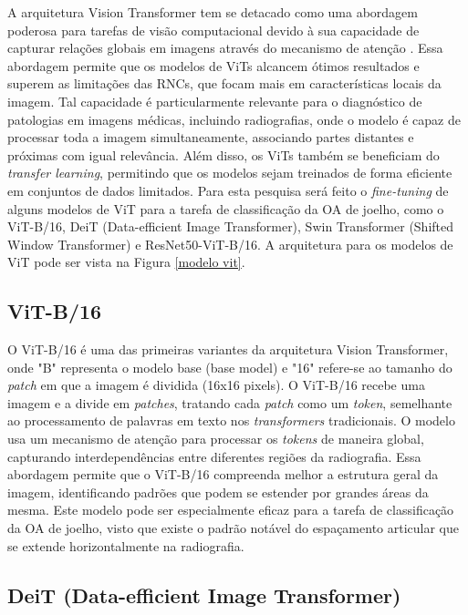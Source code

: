 A arquitetura Vision Transformer tem se detacado como uma abordagem poderosa para tarefas de visão computacional devido à sua capacidade de capturar relações globais em imagens através do mecanismo de atenção \cite{Dosovitskiy2021}. Essa abordagem permite que os modelos de ViTs alcancem ótimos resultados e superem as limitações das RNCs, que focam mais em características locais da imagem. Tal capacidade é particularmente relevante para o diagnóstico de patologias em imagens médicas, incluindo radiografias, onde o modelo é capaz de processar toda a imagem simultaneamente, associando partes distantes e próximas com igual relevância. Além disso, os ViTs também se beneficiam do \textit{transfer learning}, permitindo que os modelos sejam treinados de forma eficiente em conjuntos de dados limitados. Para esta pesquisa será feito o \textit{fine-tuning} de alguns modelos de ViT para a tarefa de classificação da OA de joelho, como o ViT-B/16, DeiT (Data-efficient Image Transformer), Swin Transformer (Shifted Window Transformer) e ResNet50-ViT-B/16. A arquitetura para os modelos de ViT pode ser vista na Figura \ref{modelo vit}.

\subsection{ViT-B/16}

O ViT-B/16 \cite{Dosovitskiy2021} é uma das primeiras variantes da arquitetura Vision Transformer, onde "B" representa o modelo base (base model) e "16" refere-se ao tamanho do \textit{patch} em que a imagem é dividida (16x16 pixels). O ViT-B/16 recebe uma imagem e a divide em \textit{patches}, tratando cada \textit{patch} como um \textit{token}, semelhante ao processamento de palavras em texto nos \textit{transformers} tradicionais. O modelo usa um mecanismo de atenção para processar os \textit{tokens} de maneira global, capturando interdependências entre diferentes regiões da radiografia. Essa abordagem permite que o ViT-B/16 compreenda melhor a estrutura geral da imagem, identificando padrões que podem se estender por grandes áreas da mesma. Este modelo pode ser especialmente eficaz para a tarefa de classificação da OA de joelho, visto que existe o padrão notável do espaçamento articular que se extende horizontalmente na radiografia.

\subsection{DeiT (Data-efficient Image Transformer)}

